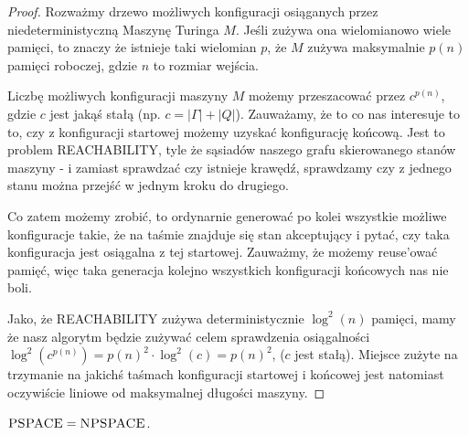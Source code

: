 \begin{proof}

	Rozważmy drzewo możliwych konfiguracji osiąganych przez niedeterministyczną Maszynę Turinga \(M\). Jeśli zużywa ona wielomianowo wiele pamięci, to
	znaczy że istnieje taki wielomian \(p\), że \(M\) zużywa maksymalnie \(p(n)\) pamięci roboczej, gdzie \(n\) to rozmiar wejścia.

	Liczbę możliwych konfiguracji maszyny \(M\) możemy przeszacować przez \(c^{p(n)}\), gdzie \(c\) jest jakąś stałą
	(np. \(c = |\Gamma| + |Q|\)). Zauważamy, że to co nas interesuje to to, czy z konfiguracji startowej możemy uzyskać konfigurację końcową.
	Jest to problem \textsc{REACHABILITY}, tyle że sąsiadów naszego grafu skierowanego stanów maszyny - i zamiast sprawdzać czy istnieje krawędź,
	sprawdzamy czy z jednego stanu można przejść w jednym kroku do drugiego.

	Co zatem możemy zrobić, to ordynarnie generować po kolei wszystkie możliwe konfiguracje takie, że na taśmie znajduje się stan akceptujący i pytać,
	czy taka konfiguracja jest osiągalna z tej startowej. Zauważmy, że możemy reuse'ować pamięć, więc taka generacja kolejno wszystkich konfiguracji
	końcowych nas nie boli.

	Jako, że \textsc{REACHABILITY} zużywa deterministycznie \(\log^2(n)\) pamięci, mamy że nasz algorytm będzie zużywać celem sprawdzenia
	osiągalności \(\log^2(c^{p(n)}) = p(n)^2 \cdot \log^2(c) = p(n)^2 \), (\(c\) jest stałą). Miejsce zużyte na trzymanie na jakichś taśmach
	konfiguracji startowej i końcowej jest natomiast oczywiście liniowe od maksymalnej długości maszyny.
\end{proof}

\begin{corollary}
	\( \textsc{PSPACE} = \textsc{NPSPACE} \).
\end{corollary}